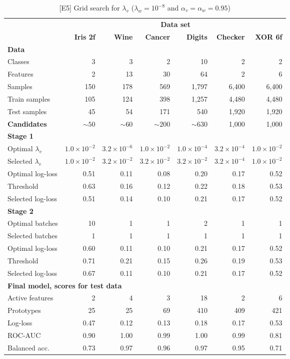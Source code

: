 \begin{table}
\caption{[E5] Grid search for $\lambda_v$ ($\lambda_w=10^{-8}$ and $\alpha_v=\alpha_w=0.95$)}
\label{tab_e5}
%
\begin{center}
\small
\begin{tabular}{|lrrrrrr|}
\hline
&\multicolumn{6}{c|}{\textbf{\hrulefill\ Data set \hrulefill}}\\
&\textbf{Iris 2f}&\textbf{Wine}&\textbf{Cancer}&\textbf{Digits}&\textbf{Checker}&\textbf{XOR 6f}\\
\multicolumn{7}{|l|}{\textbf{Data}}\\
Classes&3&3&2&10&2&2\\
Features&2&13&30&64&2&6\\
Samples&150&178&569&1,797&6,400&6,400\\
Train samples&105&124&398&1,257&4,480&4,480\\
Test samples&45&54&171&540&1,920&1,920\\
\textbf{Candidates}&$\sim50$&$\sim60$&$\sim200$&$\sim630$&1,000&1,000\\
\multicolumn{7}{|l|}{\textbf{Stage 1}}\\
Optimal $\lambda_v$&$1.0\times10^{-2}$&$3.2\times10^{-6}$&$1.0\times10^{-2}$&$1.0\times10^{-4}$&$3.2\times10^{-4}$&$1.0\times10^{-2}$\\
Selected $\lambda_v$&$1.0\times10^{-2}$&$3.2\times10^{-2}$&$3.2\times10^{-2}$&$3.2\times10^{-2}$&$3.2\times10^{-4}$&$1.0\times10^{-2}$\\
Optimal log-loss&0.51&0.11&0.08&0.20&0.17&0.52\\
Threshold&0.63&0.16&0.12&0.22&0.18&0.53\\
Selected log-loss&0.51&0.14&0.10&0.21&0.17&0.52\\
\multicolumn{7}{|l|}{\textbf{Stage 2}}\\
Optimal batches&10&1&1&2&1&1\\
Selected batches&1&1&1&1&1&1\\
Optimal log-loss&0.60&0.11&0.10&0.21&0.17&0.52\\
Threshold&0.71&0.21&0.15&0.26&0.19&0.53\\
Selected log-loss&0.67&0.11&0.10&0.21&0.17&0.52\\
\multicolumn{7}{|l|}{\textbf{Final model, scores for test data}}\\
Active features&2&4&3&18&2&6\\
Prototypes&25&25&69&410&409&421\\
Log-loss&0.47&0.12&0.13&0.18&0.17&0.53\\
ROC-AUC&0.90&1.00&0.99&1.00&0.99&0.81\\
Balanced acc.&0.73&0.97&0.96&0.97&0.95&0.71\\
\hline
\end{tabular}
\end{center}
\end{table}
